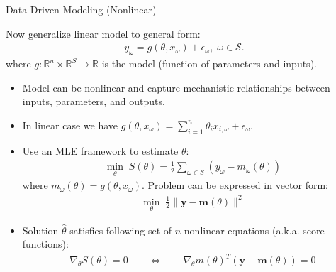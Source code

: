 \documentclass[9pt]{beamer}
\begin{document}
%
\begin{frame}{Data-Driven Modeling (Nonlinear)}

Now generalize linear model to general form:
\begin{align*}
y_\omega=g(\theta, x_{\omega}) + \epsilon_\omega,\; \omega \in \mathcal{S}.
\end{align*}
where $g:\mathbb{R}^{n}\times \mathbb{R}^S\to \mathbb{R}$ is the model (function of parameters and inputs). 

\begin{itemize}
\setlength{\itemsep}{5pt}
\item Model can be nonlinear and capture mechanistic relationships between inputs, parameters, and outputs. 

\item In linear case we have $g(\theta,x_\omega)=\sum_{i=1}^n\theta_i x_{i,\omega} + \epsilon_\omega$. 

\item Use an MLE framework to estimate $\theta$:
\begin{align*}
\min_{\theta} \; S(\theta)=\frac{1}{2}\sum_{\omega \in \mathcal{S}}(y_\omega - m_\omega(\theta))
\end{align*}
where $m_\omega(\theta)=g(\theta, x_{\omega})$.  Problem can be expressed in vector form:
\begin{align*}
\min_{\theta} \; \frac{1}{2}\|\mathbf{y} - \mathbf{m}(\theta)\|^2
\end{align*}
\item Solution $\hat{\theta}$ satisfies following set of $n$ nonlinear equations (a.k.a. score functions):
\begin{align*}
\nabla_\theta S(\theta)=0\qquad \Longleftrightarrow\qquad  \nabla_\theta m(\theta)^T(\mathbf{y}-\mathbf{m}(\theta))=0
\end{align*}
\end{itemize}
\end{frame}
\end{document}
